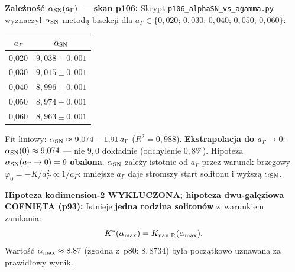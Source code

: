 \begin{remark}
\medskip
\textbf{Zale\.zno\'s\'c $\alpha_{\rm SN}(a_\Gamma)$ --- skan p106:}
Skrypt \texttt{p106\_alphaSN\_vs\_agamma.py} wyznaczy\l{}
$\alpha_{\rm SN}$ metod\k{a} bisekcji dla $a_\Gamma \in \{0{,}020;\,0{,}030;\,0{,}040;\,0{,}050;\,0{,}060\}$:
\begin{center}
\begin{tabular}{cc}
\hline
$a_\Gamma$ & $\alpha_{\rm SN}$ \\
\hline
0{,}020 & $9{,}038 \pm 0{,}001$ \\
0{,}030 & $9{,}015 \pm 0{,}001$ \\
0{,}040 & $8{,}996 \pm 0{,}001$ \\
0{,}050 & $8{,}974 \pm 0{,}001$ \\
0{,}060 & $8{,}963 \pm 0{,}001$ \\
\hline
\end{tabular}
\end{center}
Fit liniowy: $\alpha_{\rm SN} \approx 9{,}074 - 1{,}91\,a_\Gamma$
($R^2 = 0{,}988$).
\textbf{Ekstrapolacja do $a_\Gamma \to 0$}: $\alpha_{\rm SN}(0) \approx 9{,}074$
--- nie $9{,}0$ dok\l{}adnie (odchylenie $0{,}8\%$).
Hipoteza $\alpha_{\rm SN}(a_\Gamma\to 0) = 9$ \textbf{obalona}.
$\alpha_{\rm SN}$ zale\.zy istotnie od $a_\Gamma$ przez warunek brzegowy
$\dot\varphi_0 = -K/a_\Gamma^2 \propto 1/a_\Gamma$:
mniejsze $a_\Gamma$ daje stromszy start solitonu i wy\.zsz\k{a} $\alpha_{\rm SN}$.

\medskip
\textbf{Hipoteza kodimension-2 WYKLUCZONA; hipoteza dwu-gal\k{e}ziowa COFNI\k{E}TA (p93):}
Istnieje \textbf{jedna rodzina soliton\'ow} z~warunkiem zanikania:
\begin{equation}\label{eq:alpha-max-condition}
  K^*(\alpha_{\rm max}) = K_{\rm nan,R}(\alpha_{\rm max}).
\end{equation}
Warto\'s\'c $\alpha_{\rm max} \approx 8{,}87$ (zgodna z~p80: $8{,}8734$)
by\l{}a pocz\k{a}tkowo uznawana za prawid\l{}owy wynik.


\end{remark}
